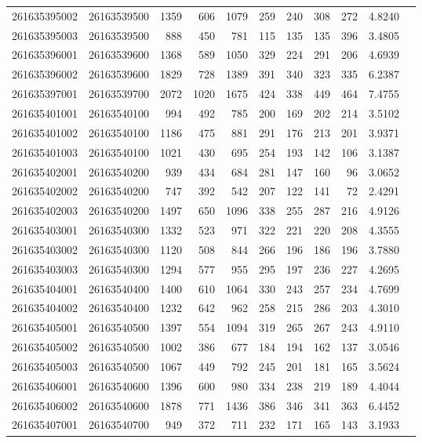 \documentclass[11pt,landscape]{article}
\begin{document}
{\begin{longtable}[]{@{}lrrrrrrrrrr@{}}
261635395002 & 26163539500 & 1359 & 606 & 1079 & 259 & 240 & 308 & 272 & 4.8240 \\
261635395003 & 26163539500 & 888 & 450 & 781 & 115 & 135 & 135 & 396 & 3.4805 \\
261635396001 & 26163539600 & 1368 & 589 & 1050 & 329 & 224 & 291 & 206 & 4.6939 \\
261635396002 & 26163539600 & 1829 & 728 & 1389 & 391 & 340 & 323 & 335 & 6.2387 \\
261635397001 & 26163539700 & 2072 & 1020 & 1675 & 424 & 338 & 449 & 464 & 7.4755 \\
261635401001 & 26163540100 & 994 & 492 & 785 & 200 & 169 & 202 & 214 & 3.5102 \\
261635401002 & 26163540100 & 1186 & 475 & 881 & 291 & 176 & 213 & 201 & 3.9371 \\
261635401003 & 26163540100 & 1021 & 430 & 695 & 254 & 193 & 142 & 106 & 3.1387 \\
261635402001 & 26163540200 & 939 & 434 & 684 & 281 & 147 & 160 & 96 & 3.0652 \\
261635402002 & 26163540200 & 747 & 392 & 542 & 207 & 122 & 141 & 72 & 2.4291 \\
261635402003 & 26163540200 & 1497 & 650 & 1096 & 338 & 255 & 287 & 216 & 4.9126 \\
261635403001 & 26163540300 & 1332 & 523 & 971 & 322 & 221 & 220 & 208 & 4.3555 \\
261635403002 & 26163540300 & 1120 & 508 & 844 & 266 & 196 & 186 & 196 & 3.7880 \\
261635403003 & 26163540300 & 1294 & 577 & 955 & 295 & 197 & 236 & 227 & 4.2695 \\
261635404001 & 26163540400 & 1400 & 610 & 1064 & 330 & 243 & 257 & 234 & 4.7699 \\
261635404002 & 26163540400 & 1232 & 642 & 962 & 258 & 215 & 286 & 203 & 4.3010 \\
261635405001 & 26163540500 & 1397 & 554 & 1094 & 319 & 265 & 267 & 243 & 4.9110 \\
261635405002 & 26163540500 & 1002 & 386 & 677 & 184 & 194 & 162 & 137 & 3.0546 \\
261635405003 & 26163540500 & 1067 & 449 & 792 & 245 & 201 & 181 & 165 & 3.5624 \\
261635406001 & 26163540600 & 1396 & 600 & 980 & 334 & 238 & 219 & 189 & 4.4044 \\
261635406002 & 26163540600 & 1878 & 771 & 1436 & 386 & 346 & 341 & 363 & 6.4452 \\
261635407001 & 26163540700 & 949 & 372 & 711 & 232 & 171 & 165 & 143 & 3.1933 \\

\end{longtable}}
\end{document}

